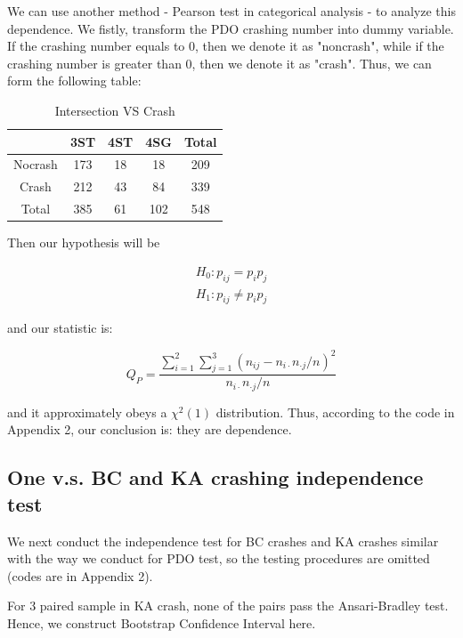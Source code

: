 \documentclass[11pt]{scrartcl} %
\begin{document}
\par
We can use another method - Pearson test in categorical analysis - to analyze this dependence. We fistly, transform the PDO crashing number into dummy variable. If the crashing number equals to 0, then we denote it as "noncrash", while if the crashing number is greater than 0, then we denote it as "crash". Thus, we can form the following table:

\begin{table}[H]
\caption{Intersection VS Crash}
\centering
\begin{tabular}{|c|c|c|c|c|}
\hline
      & 3ST & 4ST & 4SG & Total \\
\hline
Nocrash & 173 & 18  & 18 & 209 \\
\hline
Crash    & 212  & 43  & 84  & 339 \\
\hline
Total    & 385  & 61  & 102  & 548 \\
\hline
\end{tabular}
\end{table}

Then our hypothesis will be

\begin{equation*}
\begin{array}{l}
{H_0}:{p_{ij}} = {p_i}{p_j}\\
{H_1}:{p_{ij}} \ne {p_i}{p_j}
\end{array}
\end{equation*}

and our statistic is:

\begin{equation*}
{Q_P} = \frac{{\sum\limits_{i = 1}^2 {\sum\limits_{j = 1}^3 {{{\left( {{n_{ij}} - {n_{i \cdot }}{n_{ \cdot j}}/n} \right)}^2}} } }}{{{n_{i \cdot }}{n_{ \cdot j}}/n}}
\end{equation*}

and it approximately obeys a ${\chi ^2}\left( 1 \right)$ distribution. Thus, according to the code in Appendix 2, our conclusion is: they are dependence.

\subsection{One v.s. BC and KA crashing independence test}

We next conduct the independence test for BC crashes and KA crashes similar with the way we conduct for PDO test, so the testing procedures are omitted (codes are in Appendix 2).

For 3 paired sample in KA crash, none of the pairs pass the Ansari-Bradley test. Hence, we construct Bootstrap Confidence Interval here.
\end{document}
